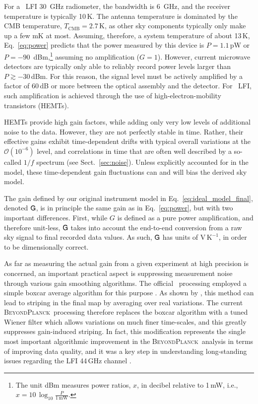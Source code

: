 \documentclass[twocolumn]{aa}
\renewcommand{\G}[0]{\tens{G}}
\newcommand{\BP}{\textsc{BeyondPlanck}}
\begin{document}
For a \Planck\ LFI 30~GHz radiometer, the bandwidth is 6~GHz, and
the receiver temperature is typically 10\,K. The antenna temperature
is dominated by the CMB temperature, $T_{\mathrm{CMB}}=2.7$\,K, as other sky
components typically only make up a few mK at
most. Assuming, therefore, a system temperature of about 13\,K,
Eq.~\eqref{eq:power} predicts that the power measured by this device is
$P=1.1\,$pW or $P=-90$~dBm,\footnote{The unit dBm measures power
  ratios, $x$, in decibel relative to 1\,mW, i.e., $x = 10\,\log_{10}
  \frac{P}{1\,\mathrm{mW}}$.} assuming no amplification
($G=1$). However, current microwave detectors are typically only able
to reliably record power levels larger than $P\gtrsim-30\,$dBm. For
this reason, the signal level must be actively amplified by a factor
of 60\,dB or more between the optical assembly and the detector. For
\Planck\ LFI, such amplification is achieved through the use of
high-electron-mobility transistors (HEMTs).

HEMTs provide high gain factors, while adding only very low levels of
additional noise to the data. However, they are not perfectly stable
in time. Rather, their effective gains exhibit time-dependent drifts
with typical overall variations at the $\mathcal{O}(10^{-6})$ level,
and correlations in time that are often well described by a so-called
$1/f$ spectrum (see Sect.~\ref{sec:noise}). Unless explicitly
accounted for in the model, these time-dependent gain fluctuations can
and will bias the derived sky model.

The gain defined by our original instrument model in
Eq.~\eqref{eq:ideal_model_final}, denoted $\G$, is in principle the same
gain as in Eq.~\eqref{eq:power}, but with two important
differences. First, while $G$ is defined as a pure power
amplification, and therefore unit-less, $\G$ takes into account the
end-to-end conversion from a raw sky signal to final recorded data
values. As such, $\G$ has units of $\mathrm{V}\,\mathrm{K}^{-1}$, in
order to be dimensionally correct.

As far as measuring the actual gain from a given experiment at high
precision is concerned, an important practical aspect is suppressing
measurement noise through various gain smoothing algorithms. The
official \Planck\ processing employed a simple boxcar average
algorithm for this purpose \citep{planck2014-a03,planck2016-l06}. As
shown by \citet{bp07}, this method can lead to striping in the final
map by averaging over real variations. The current \BP\ processing
therefore replaces the boxcar algorithm with a tuned Wiener filter
which allows variations on much finer time-scales, and this greatly
suppresses gain-induced striping. In fact, this modification
represents the single most important algorithmic improvement in the
\BP\ analysis in terms of improving data quality, and it was a key
step in understanding long-standing issues regarding the LFI 44\,GHz
channel \citep{planck2016-l02,planck2016-l05}.
\end{document}
